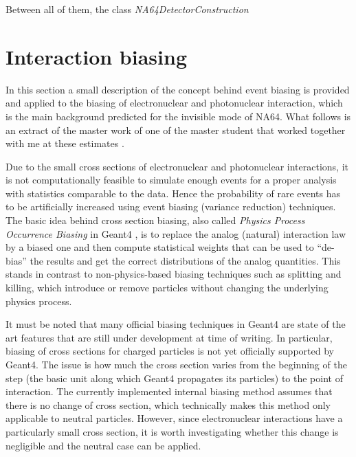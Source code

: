 Between all of them, the class \textit{NA64DetectorConstruction} 


\section{Interaction biasing}
\label{appC:sec:physics-list}

In this section a small description of the concept behind event biasing is provided and applied to the biasing of electronuclear and photonuclear interaction, which is the main background predicted for the invisible mode of NA64. What follows is an extract of the master work of one of the master student that worked together with me at these estimates \cite{pdegen-thesis}.

Due to the small cross sections of electronuclear and photonuclear interactions, it is not computationally feasible to simulate enough events for a proper analysis with statistics comparable to the data. Hence the probability of rare events has to be artificially increased using event biasing (variance reduction) techniques. The basic idea behind cross section biasing, also called \textit{Physics Process Occurrence Biasing} in Geant4 \cite{G4bias}, is to replace the analog (natural) interaction law by a biased one and then compute statistical weights that can be used to ``de-bias'' the results and get the correct distributions of the analog quantities. This stands in contrast to non-physics-based biasing techniques such as splitting and killing, which introduce or remove particles without changing the underlying physics process.

It must be noted that many official biasing techniques in Geant4 are state of the art features that are still under development at time of writing. In particular, biasing of cross sections for charged particles is not yet officially supported by Geant4. The issue is how much the cross section varies from the beginning of the step (the basic unit along which Geant4 propagates its particles) to the point of interaction. The currently implemented internal biasing method assumes that there is no change of cross section, which technically makes this method only applicable to neutral particles. However, since electronuclear interactions have a particularly small cross section, it is worth investigating whether this change is negligible and the neutral case can be applied.

